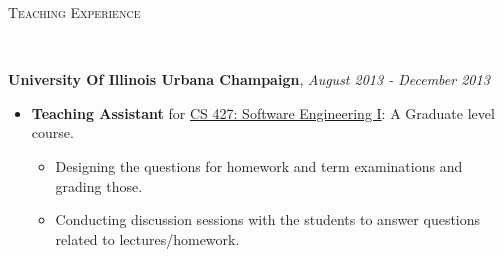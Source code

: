 \documentclass[9pt]{article}
\newenvironment{changemargin}[2]{%
  \begin{list}{}{%
    \setlength{\topsep}{0pt}%
    \setlength{\leftmargin}{#1}%
    \setlength{\rightmargin}{#2}%
    \setlength{\listparindent}{\parindent}%
    \setlength{\itemindent}{\parindent}%
    \setlength{\parsep}{\parskip}%
  }%
  \item[]}{\end{list}
}
\newcommand{\lineover}{
	\begin{changemargin}{-0.05in}{-0.05in}
		\vspace*{-8pt}
		\hrulefill \\
		\vspace*{-2pt}
	\end{changemargin}
}
\newcommand{\header}[1]{
	\begin{changemargin}{-0.5in}{-0.5in}
		\scshape{#1}\\
  	\lineover
	\end{changemargin}
}
\newenvironment{body} {
	\vspace*{-16pt}
	\begin{changemargin}{-0.25in}{-0.5in}
  }	
	{\end{changemargin}
}
\begin{document}
\smallskip

\header{Teaching Experience}

\begin{body}
	\vspace{14pt}
	\textbf{University Of Illinois Urbana Champaign},  \hfill \emph{August 2013 - December 2013}\\
	\vspace*{-4pt}
	\begin{itemize} \itemsep -0pt  %
		\item \textbf{Teaching Assistant} for \href{http://cs.illinois.edu/courses/profile/CS427-120138}{CS 427: Software Engineering I}: A Graduate level course.
			\begin{itemize}
				\item Designing the questions for homework and term examinations and grading those.
				\item Conducting discussion sessions with the students to answer questions related to lectures/homework.   
			\end{itemize}
	\end{itemize}


\end{body}
\end{document}
